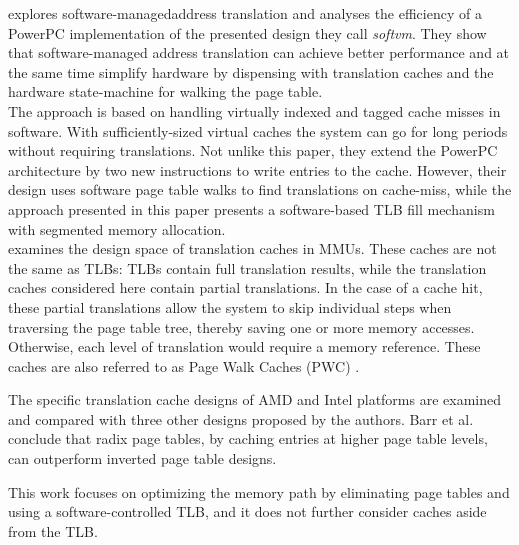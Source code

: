 \textbf{\cite{jacobSoftwaremanagedAddressTranslation1997}}explores software-managedaddress translation and analyses the efficiency of a PowerPC implementation
of the presented design they call \textit{softvm}. They show that
software-managed address translation can achieve better performance and
at the same time simplify hardware by dispensing with translation caches and
the hardware state-machine for walking the page table.\\
The approach is based on handling virtually indexed and tagged cache misses in
software.
With sufficiently-sized virtual caches the system can go for long periods
without requiring translations.
Not unlike this paper, they extend the PowerPC architecture by two new instructions
to write entries to the cache. However, their design uses software page table
walks to find translations on cache-miss, while the approach presented in this
paper presents a software-based TLB fill mechanism with segmented
memory allocation.\\


\textbf{\cite{barrTranslationCachingSkip}} examines the design space of translation caches in MMUs. These caches are not the same as TLBs: TLBs contain full translation results, while the translation caches considered here contain partial translations. In the case of a cache hit, these partial translations allow the system to skip individual steps when traversing the page table tree, thereby saving one or more memory accesses. Otherwise, each level of translation would require a memory reference. These caches are also referred to as Page Walk Caches (PWC) \cite{yaniv2016hash}.

The specific translation cache designs of AMD and Intel platforms are examined and compared with three other designs proposed by the authors. Barr et al. conclude that radix page tables, by caching entries at higher page table levels, can outperform inverted page table designs.

This work focuses on optimizing the memory path by eliminating page tables and using a software-controlled TLB, and it does not further consider caches aside from the TLB.



